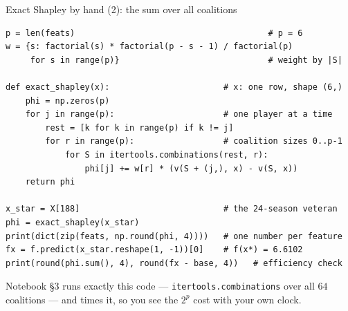 \documentclass[aspectratio=169,11pt]{beamer}
\begin{document}
\begin{frame}[fragile]{Exact Shapley by hand (2): the sum over all coalitions}
  \begin{lstlisting}[basicstyle=\ttfamily\scriptsize]
p = len(feats)                                       # p = 6
w = {s: factorial(s) * factorial(p - s - 1) / factorial(p)
     for s in range(p)}                              # weight by |S|

def exact_shapley(x):                       # x: one row, shape (6,)
    phi = np.zeros(p)
    for j in range(p):                      # one player at a time
        rest = [k for k in range(p) if k != j]
        for r in range(p):                  # coalition sizes 0..p-1
            for S in itertools.combinations(rest, r):
                phi[j] += w[r] * (v(S + (j,), x) - v(S, x))
    return phi

x_star = X[188]                             # the 24-season veteran
phi = exact_shapley(x_star)
print(dict(zip(feats, np.round(phi, 4))))   # one number per feature
fx = f.predict(x_star.reshape(1, -1))[0]    # f(x*) = 6.6102
print(round(phi.sum(), 4), round(fx - base, 4))   # efficiency check
  \end{lstlisting}
  \begin{labnote}
    Notebook \S3 runs exactly this code --- \texttt{itertools.combinations} over all
    $64$ coalitions --- and times it, so you see the $2^p$ cost with your own clock.
  \end{labnote}
\end{frame}
\end{document}
